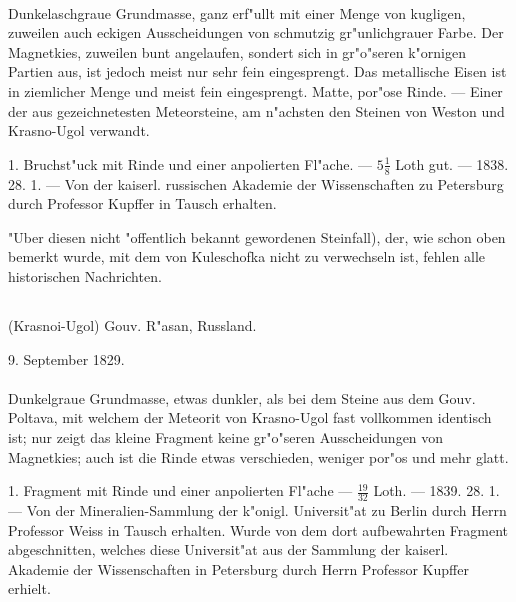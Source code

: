 \documentclass[a4paper, 11pt, oneside, polutonikogreek, german]{article}
\begin{document}
\paragraph{}
Dunkelaschgraue Grundmasse, ganz erf"ullt mit einer Menge von kugligen, zuweilen auch eckigen Ausscheidungen von schmutzig gr"unlichgrauer Farbe. Der Magnetkies, zuweilen bunt angelaufen, sondert sich in gr"o"seren k"ornigen Partien aus, ist jedoch meist nur sehr fein eingesprengt. Das metallische Eisen ist in ziemlicher Menge und meist fein eingesprengt. Matte, por"ose Rinde. --- Einer der aus gezeichnetesten Meteorsteine‚ am n"achsten den Steinen von Weston und Krasno-Ugol verwandt.

1. Bruchst"uck mit Rinde und einer anpolierten Fl"ache. --- $5\frac{1}{8}$ Loth gut. --- 1838. 28. 1. --- Von der kaiserl. russischen Akademie der Wissenschaften zu Petersburg durch Professor Kupffer in Tausch erhalten.

\setlength{\leftskip}{10mm}
\setlength{\parindent}{0pt}

{\footnotesize "Uber diesen nicht "offentlich bekannt gewordenen Steinfall), der, wie schon oben bemerkt wurde, mit dem von Kuleschofka nicht zu verwechseln ist, fehlen alle historischen Nachrichten.}

\setlength{\leftskip}{0pt}
\setlength{\parindent}{20pt}

\subsection{}
\begin{center}

(Krasnoi-Ugol) Gouv. R"asan, Russland.

9. September 1829.
\end{center}
\paragraph{}
Dunkelgraue Grundmasse, etwas dunkler, als bei dem Steine aus dem Gouv. Poltava, mit welchem der Meteorit von Krasno-Ugol fast vollkommen identisch ist; nur zeigt das kleine Fragment keine gr"o"seren Ausscheidungen von Magnetkies; auch ist die Rinde etwas verschieden, weniger por"os und mehr glatt.

1. Fragment mit Rinde und einer anpolierten Fl"ache --- $\frac{19}{32}$ Loth. --- 1839. 28. 1. --- Von der Mineralien-Sammlung der k"onigl. Universit"at zu Berlin durch Herrn Professor Weiss in Tausch erhalten. Wurde von dem dort aufbewahrten Fragment abgeschnitten, welches diese Universit"at aus der Sammlung der kaiserl. Akademie der Wissenschaften in Petersburg durch Herrn Professor Kupffer erhielt.
\end{document}
